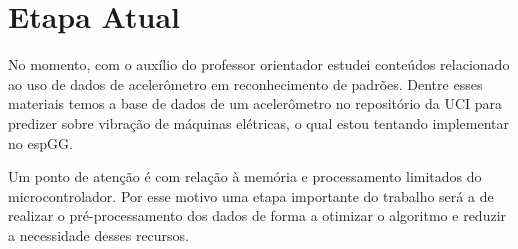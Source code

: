 \pagebreak
\section{Etapa Atual}

No momento, com o auxílio do professor orientador estudei conteúdos relacionado ao uso de dados de acelerômetro
em reconhecimento de padrões.
Dentre esses materiais temos a base de dados de um acelerômetro\cite{AccelerometerData} no repositório da UCI para predizer sobre vibração de máquinas elétricas, o qual estou tentando implementar no espGG. 


Um ponto de atenção é com relação à memória e processamento limitados do microcontrolador. Por esse motivo uma etapa importante do trabalho
será a de realizar o pré-processamento dos dados de forma a otimizar o algoritmo e reduzir a necessidade desses recursos.


